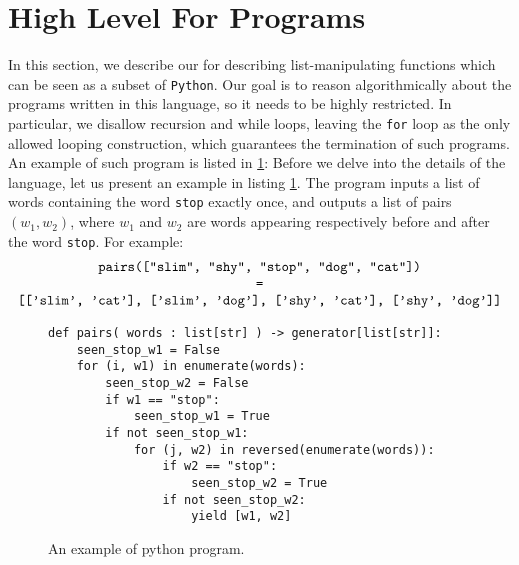 \section{High Level For Programs}
\label{sec:high_level}

\AP In this section, we describe our  for describing
list-manipulating functions which can be seen as a subset of \texttt{Python}.
Our goal is to reason algorithmically about the programs written in this language,
so it needs to be highly restricted. In particular, we disallow recursion and
while loops, leaving the \texttt{for} loop as the only allowed looping
construction, which guarantees the termination of such programs.
An example of such program is listed in \cref{fig:python-example}: 
Before we delve into the details of the language, let us present 
an example in listing \ref{fig:python-example}. The program inputs
a list of words containing the word \texttt{stop} exactly once,
and outputs a list of pairs $(w_1, w_2)$, where $w_1$ and $w_2$ are words
appearing respectively before and after the word \texttt{stop}. For example:
\[
\begin{tabular}{c}
    \texttt{pairs(["slim", "shy", "stop", "dog", "cat"])} \\
    \texttt{=} \\
    \texttt{[['slim', 'cat'], ['slim', 'dog'], ['shy', 'cat'], ['shy', 'dog']]}
\end{tabular}
\] 
\begin{figure}[h]
\begin{verbatim}
def pairs( words : list[str] ) -> generator[list[str]]:
    seen_stop_w1 = False
    for (i, w1) in enumerate(words):
        seen_stop_w2 = False
        if w1 == "stop":
            seen_stop_w1 = True
        if not seen_stop_w1:
            for (j, w2) in reversed(enumerate(words)):
                if w2 == "stop":
                    seen_stop_w2 = True
                if not seen_stop_w2:
                    yield [w1, w2]
\end{verbatim}
\caption{An example of python program.}
\label{fig:python-example}
\end{figure}


